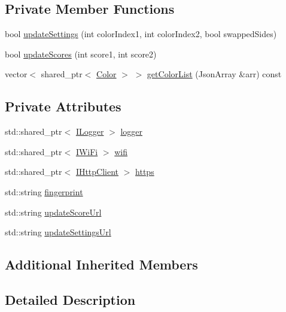 \subsection*{Private Member Functions}
\begin{DoxyCompactItemize}
\item 
bool \hyperlink{class_server_in_out_a687c760ff3ad5f33c6d157d9eaefc262}{update\+Settings} (int color\+Index1, int color\+Index2, bool swapped\+Sides)
\item 
bool \hyperlink{class_server_in_out_aaa8e027abfe326208f48890b7e225672}{update\+Scores} (int score1, int score2)
\item 
vector$<$ shared\+\_\+ptr$<$ \hyperlink{struct_color}{Color} $>$ $>$ \hyperlink{class_server_in_out_a952f5812bddca76e92d5432c1890551d}{get\+Color\+List} (Json\+Array \&arr) const
\end{DoxyCompactItemize}
\subsection*{Private Attributes}
\begin{DoxyCompactItemize}
\item 
std\+::shared\+\_\+ptr$<$ \hyperlink{class_i_logger}{I\+Logger} $>$ \hyperlink{class_server_in_out_a50c14553e627e15295eb3a0524478589}{logger}
\item 
std\+::shared\+\_\+ptr$<$ \hyperlink{class_i_wi_fi}{I\+Wi\+Fi} $>$ \hyperlink{class_server_in_out_abbaeaec2b3d84e8c4c62629cfd7c6b2c}{wifi}
\item 
std\+::shared\+\_\+ptr$<$ \hyperlink{class_i_http_client}{I\+Http\+Client} $>$ \hyperlink{class_server_in_out_a8a36805b52227548d216bd81a62f3abb}{https}
\item 
std\+::string \hyperlink{class_server_in_out_a30de1f0615a253f6fff1876c310260d9}{fingerprint}
\item 
std\+::string \hyperlink{class_server_in_out_ab7eb8b232c914508eae5a5ebffe71c67}{update\+Score\+Url}
\item 
std\+::string \hyperlink{class_server_in_out_ac92c1702a2f9153c58c962db79de2b87}{update\+Settings\+Url}
\end{DoxyCompactItemize}
\subsection*{Additional Inherited Members}


\subsection{Detailed Description}



